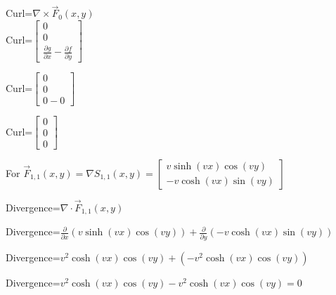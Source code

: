 \documentclass[12pt, executivepaper]{article}
\begin{document}
\begin{flushleft}
\vspace{3mm}

Curl=$\nabla \times \vec F_{0}(x,y)$ \\

Curl=$\begin{bmatrix}
0 \\
0 \\
\frac{\partial g}{\partial x}-\frac{\partial f}{\partial y}
\end{bmatrix}$ \\

\vspace{3mm}

Curl=$\begin{bmatrix}
0 \\
0 \\
0-0
\end{bmatrix}$ \\

\vspace{3mm}

Curl=$\begin{bmatrix}
0 \\
0 \\
0
\end{bmatrix}$ \\

\vspace{5mm}

For $\vec F_{1,1}(x,y)=\nabla S_{1,1}(x,y)=
\begin{bmatrix}
v\sinh(vx)\cos(vy) \\
-v\cosh(vx)\sin(vy)
\end{bmatrix}$

\vspace{3mm}

Divergence=$\nabla \cdot \vec F_{1,1}(x,y)$ \\

\vspace{3mm}

Divergence=$\frac{\partial}{\partial x}(v\sinh(vx)\cos(vy))+\frac{\partial}{\partial y}(-v\cosh(vx)\sin(vy))$ \\

\vspace{3mm}

Divergence=$v^2\cosh(vx)\cos(vy)+ (-v^2\cosh(vx)\cos(vy))$ \\

\vspace{3mm}

Divergence=$v^2\cosh(vx)\cos(vy)-v^2\cosh(vx)\cos(vy)=0$ \\


\end{flushleft}
\end{document}
